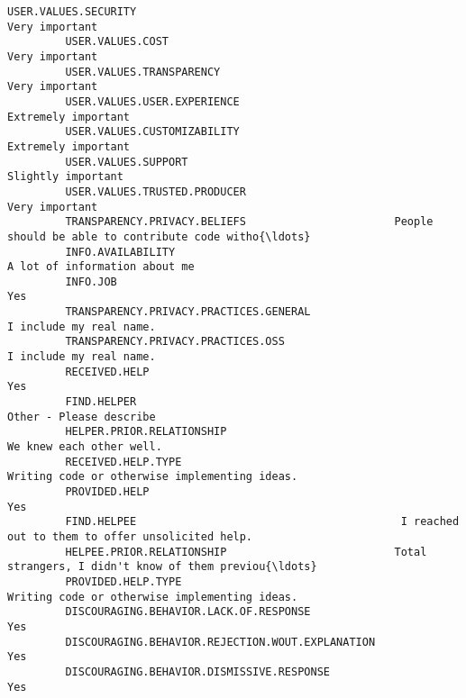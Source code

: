 \documentclass[11pt]{article}
\begin{document}
\begin{Verbatim}[commandchars=\\\{\}]
         USER.VALUES.SECURITY                                                                  Very important   
         USER.VALUES.COST                                                                      Very important   
         USER.VALUES.TRANSPARENCY                                                              Very important   
         USER.VALUES.USER.EXPERIENCE                                                      Extremely important   
         USER.VALUES.CUSTOMIZABILITY                                                      Extremely important   
         USER.VALUES.SUPPORT                                                               Slightly important   
         USER.VALUES.TRUSTED.PRODUCER                                                          Very important   
         TRANSPARENCY.PRIVACY.BELIEFS                       People should be able to contribute code witho{\ldots}   
         INFO.AVAILABILITY                                                      A lot of information about me   
         INFO.JOB                                                                                         Yes   
         TRANSPARENCY.PRIVACY.PRACTICES.GENERAL                                       I include my real name.   
         TRANSPARENCY.PRIVACY.PRACTICES.OSS                                           I include my real name.   
         RECEIVED.HELP                                                                                    Yes   
         FIND.HELPER                                                                  Other - Please describe   
         HELPER.PRIOR.RELATIONSHIP                                                   We knew each other well.   
         RECEIVED.HELP.TYPE                                     Writing code or otherwise implementing ideas.   
         PROVIDED.HELP                                                                                    Yes   
         FIND.HELPEE                                         I reached out to them to offer unsolicited help.   
         HELPEE.PRIOR.RELATIONSHIP                          Total strangers, I didn't know of them previou{\ldots}   
         PROVIDED.HELP.TYPE                                     Writing code or otherwise implementing ideas.   
         DISCOURAGING.BEHAVIOR.LACK.OF.RESPONSE                                                           Yes   
         DISCOURAGING.BEHAVIOR.REJECTION.WOUT.EXPLANATION                                                 Yes   
         DISCOURAGING.BEHAVIOR.DISMISSIVE.RESPONSE                                                        Yes   

\end{Verbatim}
\end{document}
